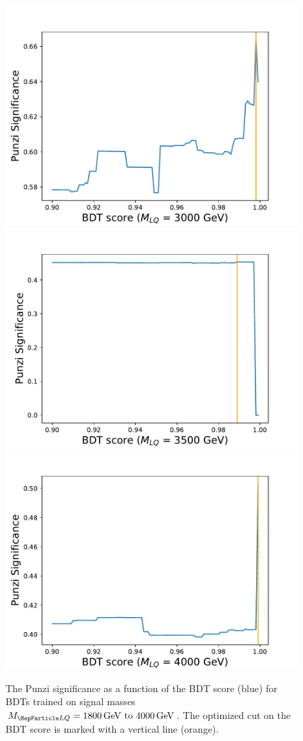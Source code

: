 \begin{figure}[H]
    {\includegraphics[width=.32\textwidth]{Images/Analysis/Results_combined_Unblinded/Plots/Optimization/Opt_BDT_M3000.pdf}}
    {\includegraphics[width=.32\textwidth]{Images/Analysis/Results_combined_Unblinded/Plots/Optimization/Opt_BDT_M3500.pdf}}
    {\includegraphics[width=.32\textwidth]{Images/Analysis/Results_combined_Unblinded/Plots/Optimization/Opt_BDT_M4000.pdf}}
    \caption{The Punzi significance as a function of the BDT score (blue) for BDTs trained on signal masses $\MLQ = \SIrange{1800}{4000}{GeV}$. The optimized cut on the BDT score is marked with a vertical line (orange).
    \label{figapp:punzivsbdt2}}
\end{figure}



